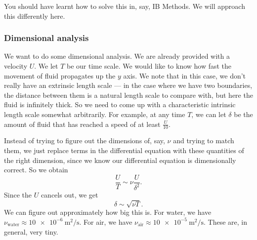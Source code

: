 \documentclass[a4paper]{article}
\begin{document}
You should have learnt how to solve this in, say, IB Methods. We will approach this differently here.
\subsubsection{Dimensional analysis}
We want to do some dimensional analysis. We are already provided with a velocity $U$. We let $T$ be our time scale. We would like to know how fast the movement of fluid propagates up the $y$ axis. We note that in this case, we don't really have an extrinsic length scale --- in the case where we have two boundaries, the distance between them is a natural length scale to compare with, but here the fluid is infinitely thick. So we need to come up with a characteristic intrinsic length scale somewhat arbitrarily. For example, at any time $T$, we can let $\delta$ be the amount of fluid that has reached a speed of at least $\frac{U}{10}$.

Instead of trying to figure out the dimensions of, say, $\nu$ and trying to match them, we just replace terms in the differential equation with these quantities of the right dimension, since we know our differential equation is dimensionally correct. So we obtain
\[
  \frac{U}{T} \sim \nu \frac{U}{\delta^2}.
\]
Since the $U$ cancels out, we get
\[
  \delta \sim \sqrt{\nu T}.
\]
We can figure out approximately how big this is. For water, we have $\nu_{\mathrm{water}} \approx \SI{10e-6}{\meter\squared\per\second}$. For air, we have $\nu_{\mathrm{air}} \approx \SI{10e-5}{\meter\squared\per\second}$. These are, in general, very tiny.
\end{document}

